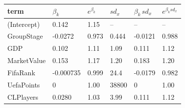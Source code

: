 
\begin{tabular}{llllll}
\toprule
term & $\beta_k$ & $e^{\beta_k}$ & $sd_x$ & $\beta_k \, sd_x$ & $e^{\beta_k sd_x}$\\
\midrule
(Intercept) & 0.142 & 1.15 & -- & -- & --\\
GroupStage & -0.0272 & 0.973 & 0.444 & -0.0121 & 0.988\\
GDP & 0.102 & 1.11 & 1.09 & 0.111 & 1.12\\
MarketValue & 0.153 & 1.17 & 1.20 & 0.183 & 1.20\\
FifaRank & -0.000735 & 0.999 & 24.4 & -0.0179 & 0.982\\
UefaPoints & 0 & 1.00 & 38800 & 0 & 1.00\\
CLPlayers & 0.0280 & 1.03 & 3.99 & 0.111 & 1.12\\
\bottomrule
\end{tabular}
